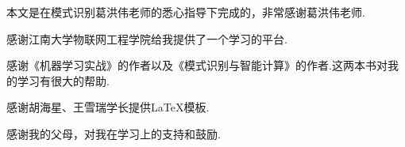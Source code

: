 \documentclass[bachelor,winfonts]{jnuthesis}
\begin{document}
\nocite{*}

%
%

\begin{acknowledgement}
  本文是在模式识别葛洪伟老师的悉心指导下完成的，非常感谢葛洪伟老师.

  感谢江南大学物联网工程学院给我提供了一个学习的平台.

  感谢《机器学习实战》的作者以及《模式识别与智能计算》的作者.这两本书对我的学习有很大的帮助.

  感谢胡海星、王雪瑞学长提供\LaTeX 模板.

  感谢我的父母，对我在学习上的支持和鼓励.
  
\end{acknowledgement}

\backmatter




\end{document}

